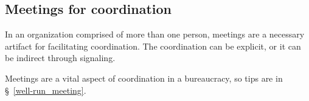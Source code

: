 \subsection{Meetings for coordination}
In an organization comprised of more than one person, meetings are a necessary artifact for facilitating coordination. The coordination can be explicit, or it can be indirect through signaling. 

Meetings are a vital aspect of coordination in a bureaucracy, so tips are in \S~\ref{well-run_meeting}.